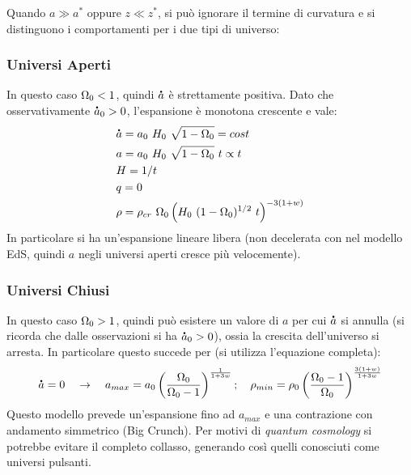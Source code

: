 Quando $a\gg a^*$ oppure $z\ll z^*$, si può ignorare il termine di curvatura e si distinguono i comportamenti per i due tipi di universo:

\subsubsection{Universi Aperti}
In questo caso $\Omega_0 < 1$, quindi $\accentset{\mbox{\large\bfseries .}}{a}$ è strettamente positiva. Dato che osservativamente $\accentset{\mbox{\large\bfseries .}}{a}_0 >0$, l'espansione è monotona crescente e vale:
\begin{align}
   & \accentset{\mbox{\large\bfseries .}}{a}=a_0~ H_0 ~ \sqrt{1-\Omega_0 }=cost \\
   & a=a_0~ H_0 ~ \sqrt{1-\Omega_0 }~ t  \propto t \\
   & H= 1/t \\
   & q= 0 \\
   & \rho =\rho_{cr} ~\Omega_0 \left ( H_0  ~(1-\Omega_0)^{1/2} ~ t   \right )^{-3(1+w)}
\end{align}
In particolare si ha un'espansione lineare libera (non decelerata con nel modello EdS, quindi $a$ negli universi aperti cresce più velocemente). 

\subsubsection{Universi Chiusi}
In questo caso $\Omega_0 > 1$, quindi può esistere un valore di $a$ per cui $\accentset{\mbox{\large\bfseries .}}{a}$ si annulla (si ricorda che dalle osservazioni si ha $\accentset{\mbox{\large\bfseries .}}{a}_0>0$), ossia la crescita dell'universo si arresta. In particolare questo succede per (si utilizza l'equazione completa):
$$
\accentset{\mbox{\large\bfseries .}}{a}=0 \quad \rightarrow \quad a_{max}=a_0 \left ( \frac{\Omega_0}{\Omega_0 -1} \right )^{\frac{1}{1+3w}}; \quad \rho_{min}=\rho_0 \left ( \frac{\Omega_0 -1}{\Omega_0} \right )^{\frac{3(1+w)}{1+3w}}
$$
Questo modello prevede un'espansione fino ad $a_{max}$ e una contrazione con andamento simmetrico (Big Crunch). Per motivi di \textit{quantum cosmology} si potrebbe evitare il completo collasso, generando così quelli conosciuti come universi pulsanti. 

